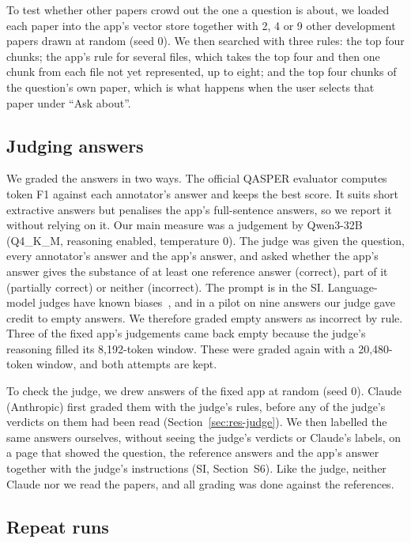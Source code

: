 To test whether other papers crowd out the one a question is about, we loaded each paper into the
app's vector store together with 2, 4 or 9 other development papers drawn at random (seed 0). We
then searched with three rules: the top four chunks; the app's rule for several files, which takes
the top four and then one chunk from each file not yet represented, up to eight; and the top four
chunks of the question's own paper, which is what happens when the user selects that paper under
``Ask about''.

\subsection{Judging answers}

We graded the answers in two ways. The official QASPER evaluator computes token F1 against each
annotator's answer and keeps the best score. It suits short extractive answers but penalises the
app's full-sentence answers, so we report it without relying on it. Our main measure was a
judgement by Qwen3-32B~\cite{yang2025qwen3} (Q4\_K\_M, reasoning enabled, temperature 0). The
judge was given the question, every annotator's answer and the app's answer, and asked whether
the app's answer gives the substance of at least one reference answer (correct), part of it
(partially correct) or neither (incorrect). The prompt is in the SI. Language-model judges have
known biases~\cite{zheng2023judge}, and in a pilot on nine answers our judge gave credit to empty
answers. We therefore graded empty answers as incorrect by rule. Three of the fixed app's
judgements came back empty because the judge's reasoning filled its 8,192-token window. These
were graded again with a 20,480-token window, and both attempts are kept.

To check the judge, we drew \JudgeCheckN{} answers of the fixed app at random (seed 0). Claude
(Anthropic) first graded them with the judge's rules, before any of the judge's verdicts on them
had been read (Section~\ref{sec:res-judge}). We then labelled the same answers ourselves, without
seeing the judge's verdicts or Claude's labels, on a page that showed the question, the reference
answers and the app's answer together with the judge's instructions (SI, Section~S6). Like the
judge, neither Claude nor we read the papers, and all grading was done against the references.

\subsection{Repeat runs}
\label{sec:eval-repeats}

